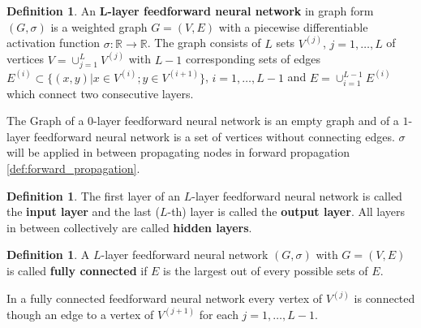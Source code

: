 \documentclass{article}
\theoremstyle{definition}
\newtheorem{definition}[theorem]{Definition}
\begin{document}
\begin{definition}
\label{def:graphFeedForwardNetwork}
An \textbf{L-layer feedforward neural network} in graph form $(G, \sigma)$ is a weighted graph $G=(V, E)$ with a piecewise differentiable activation function $\sigma: \mathbb{R} \to \mathbb{R}$. The graph consists of $L$ sets $V^{(j)}$, $j = 1, \dots , L$ of vertices $V=\cup_{j=1}^{L}V^{(j)}$ with $L-1$ corresponding sets of edges $E^{(i)} \subset \{(x,y)|x \in V^{(i)}; y \in V^{(i+1)}\}$, $i = 1, \dots , L-1$ and $E=\cup_{i=1}^{L-1}E^{(i)}$ which connect two consecutive layers.
\end{definition}

The Graph of a $0$-layer feedforward neural network is an empty graph and of a $1$-layer feedforward neural network is a set of vertices without connecting edges. $\sigma$ will be applied in between propagating nodes in forward propagation \ref{def:forward_propagation}.

\begin{definition}
The first layer of an $L$-layer feedforward neural network is called the \textbf{input layer} and the last ($L$-th) layer is called the \textbf{output layer}. All layers in between collectively are called \textbf{hidden layers}.
\end{definition}

\begin{definition}
A $L$-layer feedforward neural network $(G, \sigma)$ with $G = (V, E)$ is called \textbf{fully connected} if $E$ is the largest out of every possible sets of $E$.
\end{definition}

In a fully connected feedforward neural network every vertex of $V^{(j)}$ is connected though an edge to a vertex of $V^{(j+1)}$ for each $j = 1, \dots , L-1$.
\end{document}
